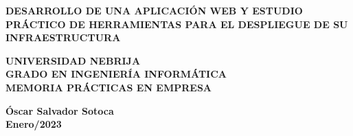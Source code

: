\documentclass[11pt]{article}
\begin{document}
	\begin{titlepage}
		{\color{white}{.}}
		\linebreak
		\linebreak
		
		\centering
		\linebreak
		\vspace{3cm}
		
		{\LARGE\textbf{\color{RojoNebrija}DESARROLLO DE UNA APLICACIÓN WEB Y ESTUDIO PRÁCTICO DE HERRAMIENTAS PARA EL DESPLIEGUE DE SU INFRAESTRUCTURA}\par}
		\vspace{2cm}
		
		{\Large \textbf{\color{black}UNIVERSIDAD NEBRIJA \\ GRADO EN INGENIERÍA INFORMÁTICA \\ MEMORIA PRÁCTICAS EN EMPRESA}\par}
		\vspace{2cm}
		

		{\Large \textbf{ Óscar Salvador Sotoca\\ Enero/2023}\par}
		\vspace{2cm}

	\end{titlepage}
\end{document}
